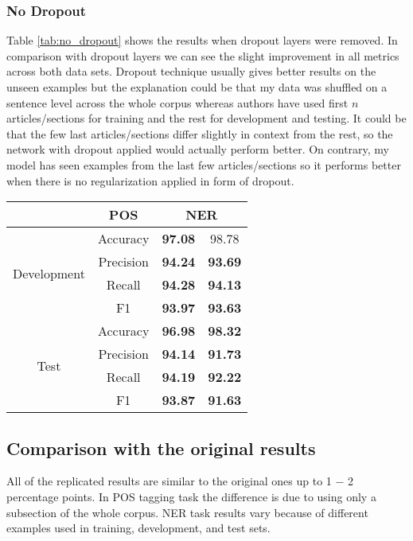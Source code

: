 \label{peculiar_dropout}
\subsubsection{No Dropout}
Table \ref{tab:no_dropout} shows the results when dropout layers were removed.
In comparison with dropout layers we can see the slight improvement in all
metrics across both data sets. Dropout technique usually gives better results
on the unseen examples but the explanation could be that my data was shuffled
on a sentence level across the whole corpus whereas authors have used first $n$
articles/sections for training and the rest for development and testing. It
could be that the few last articles/sections differ slightly in context from
the rest, so the network with dropout applied would actually perform better. On
contrary, my model has seen examples from the last few articles/sections so it
performs better when there is no regularization applied in form of dropout.

\begin{center}
\begin{tabular}{ |c|c|c|c| }
\hline
& {\textbf{POS}} & \multicolumn{2}{|c|}{\textbf{NER}}\\ \hline
\multirow{4}{*}{Development} & Accuracy & \textbf{97.08} & 98.78 \\
 & Precision & \textbf{94.24} & \textbf{93.69} \\
 & Recall & \textbf{94.28} & \textbf{94.13} \\
 & F1 & \textbf{93.97} & \textbf{93.63} \\ \hline
\multirow{4}{*}{Test} & Accuracy & \textbf{96.98} & \textbf{98.32} \\
 & Precision & \textbf{94.14} & \textbf{91.73} \\
 & Recall & \textbf{94.19} & \textbf{92.22} \\
 & F1 & \textbf{93.87} & \textbf{91.63} \\ \hline
\end{tabular}
\label{tab:no_dropout}
\end{center}


\subsection{Comparison with the original results}
All of the replicated results are similar to the original ones up to 1 $-$ 2
percentage points. In POS tagging task the difference is due to using only a subsection of
the whole corpus. NER task results vary because of different examples used
in training, development, and test sets.

